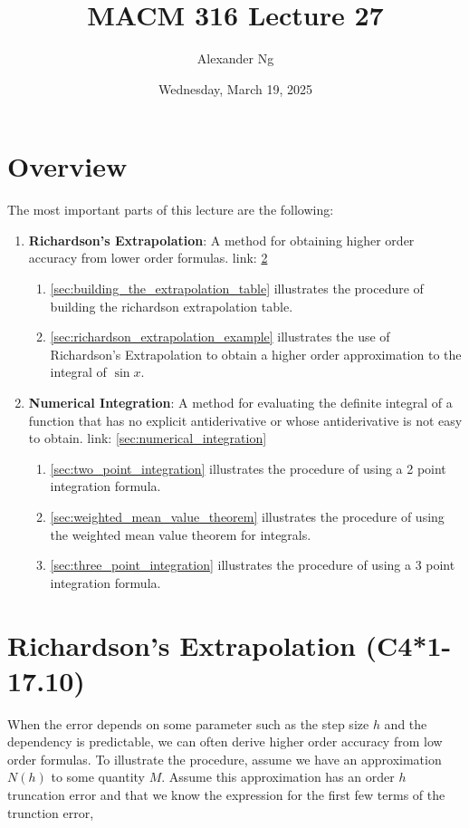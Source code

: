 \documentclass[12pt]{article}
\title{MACM 316 Lecture 27}
\author{Alexander Ng}
\date{Wednesday, March 19, 2025}
\begin{document}
\maketitle

\section{Overview}

The most important parts of this lecture are the following:

\begin{enumerate}
\item \textbf{Richardson's Extrapolation}: A method for obtaining higher order
  accuracy from lower order formulas. link: \ref{sec:richardson_extrapolation}
  \begin{enumerate}
    \item \ref{sec:building_the_extrapolation_table} illustrates the procedure of
      building the richardson extrapolation table.
    \item \ref{sec:richardson_extrapolation_example} illustrates the use of
      Richardson's Extrapolation to obtain a higher order approximation to the
      integral of $\sin x$.
  \end{enumerate}
\item \textbf{Numerical Integration}: A method for evaluating the definite
  integral of a function that has no explicit antiderivative or whose antiderivative
  is not easy to obtain. link: \ref{sec:numerical_integration}
  \begin{enumerate}
    \item \ref{sec:two_point_integration} illustrates the procedure of using a
      2 point integration formula.
    \item \ref{sec:weighted_mean_value_theorem} illustrates the procedure of
      using the weighted mean value theorem for integrals.
    \item \ref{sec:three_point_integration} illustrates the procedure of using a
      3 point integration formula.
  \end{enumerate}
\end{enumerate}

\pagebreak
\section{Richardson's Extrapolation (C4*1-17.10)}\label{sec:richardson_extrapolation}

When the error depends on some parameter such as the step size $h$ and the
dependency is predictable, we can often derive higher order accuracy from low
order formulas. To illustrate the procedure, assume we have an approximation
$N(h)$ to some quantity $M$. Assume this approximation has an order $h$
truncation error and that we know the expression for the first few terms of the
trunction error,
\end{document}
